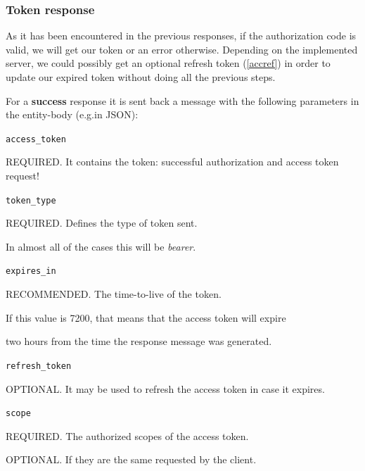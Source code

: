 \subsubsection{Token response}
As it has been encountered in the previous responses, if the authorization code is valid, we will get our token or an error otherwise. Depending on the implemented server, we could possibly get an optional refresh token (\ref{accref}) in order to update our expired token without doing all the previous steps.

For a \textbf{success} response it is sent back a message with the following parameters in the entity-body (e.g.in JSON):

\texttt{access\_token}

\hspace{0.5cm}REQUIRED. It contains the token: successful authorization and access token request! 

\texttt{token\_type}

\hspace{0.5cm}REQUIRED. Defines the type of token sent.

\hspace{0.5cm}In almost all of the cases this will be \textit{bearer}.

\texttt{expires\_in}

\hspace{0.5cm}RECOMMENDED. The time-to-live of the token.

\hspace{0.5cm}If this value is 7200, that means that the access token will expire

\hspace{0.5cm}two hours from the time the response message was generated.

\vspace{0.5cm}

\texttt{refresh\_token}

\hspace{0.5cm}OPTIONAL. It may be used to refresh the access token in case it expires.

\texttt{scope}

\hspace{0.5cm}REQUIRED. The authorized scopes of the access token.

\hspace{0.5cm}OPTIONAL. If they are the same requested by the client.

\vspace{0.5cm}


